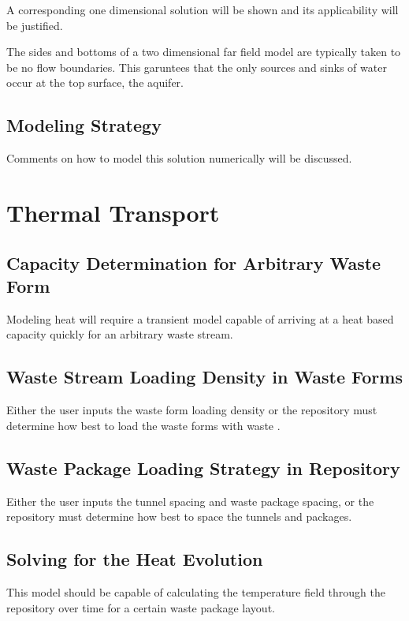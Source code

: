\documentclass[letterpaper]{article}
\begin{document}
A corresponding one dimensional solution will be shown and its applicability 
will be justified.

The sides and bottoms of a two dimensional far field model are typically taken 
to be no flow boundaries. This garuntees that the only sources and sinks of 
water occur at the top surface, the aquifer.  

\subsection{Modeling Strategy}

Comments on how to model this solution numerically will be discussed.


\section{Thermal Transport}


\subsection{Capacity Determination for Arbitrary Waste Form}

Modeling heat will require a transient model capable of arriving at a heat based 
capacity quickly for an arbitrary waste stream. 

\subsection{Waste Stream Loading Density in Waste Forms}

Either the user inputs the waste form loading density or the repository must 
determine how best to load the waste forms with waste .

\subsection{Waste Package Loading Strategy in Repository}

Either the user inputs the tunnel spacing and waste package spacing, or the 
repository must determine how best to space the tunnels and packages.

\subsection{Solving for the Heat Evolution}

This model should be capable of calculating the temperature field through the 
repository over time for a certain waste package layout. 


\pagebreak


\end{document}
